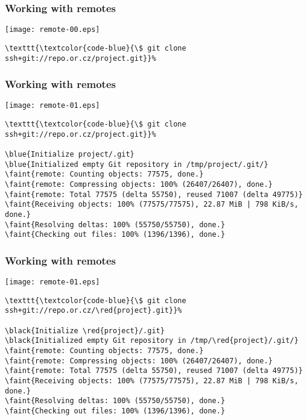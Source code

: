 \documentclass[english]{beamer}
\newcommand{\CMD}[1]{%
\texttt{\textcolor{code-blue}{#1}}%
}
\newcommand{\black}[1]{%
\textcolor{code-black}{#1}%
}
\newcommand{\faint}[1]{%
\textcolor{code-gray}{#1}%
}
\newcommand{\blue}[1]{%
\textcolor{code-blue}{#1}%
}
\newcommand{\red}[1]{%
\textcolor{code-red}{#1}%
}
\begin{document}
\begin{frame}[fragile]
\frametitle{Working with remotes}

\texttt{[image: remote-00.eps]}

\begin{Verbatim}[commandchars=\\\{\}]
\CMD{\$ git clone ssh+git://repo.or.cz/project.git}
\end{Verbatim}
\vspace{\textheight}
\end{frame}

\begin{frame}[fragile]
\frametitle{Working with remotes}

\texttt{[image: remote-01.eps]}

{\tiny
\begin{Verbatim}[commandchars=\\\{\}]
\CMD{\$ git clone ssh+git://repo.or.cz/project.git}
\blue{Initialize project/.git}
\blue{Initialized empty Git repository in /tmp/project/.git/}
\faint{remote: Counting objects: 77575, done.}
\faint{remote: Compressing objects: 100% (26407/26407), done.}
\faint{remote: Total 77575 (delta 55750), reused 71007 (delta 49775)}
\faint{Receiving objects: 100% (77575/77575), 22.87 MiB | 798 KiB/s, done.}
\faint{Resolving deltas: 100% (55750/55750), done.}
\faint{Checking out files: 100% (1396/1396), done.}
\end{Verbatim}
}
\vspace{\textheight}
\end{frame}

\begin{frame}[fragile]
\frametitle{Working with remotes}

\texttt{[image: remote-01.eps]}

{\tiny
\begin{Verbatim}[commandchars=\\\{\}]
\CMD{\$ git clone ssh+git://repo.or.cz/\red{project}.git}
\black{Initialize \red{project}/.git}
\black{Initialized empty Git repository in /tmp/\red{project}/.git/}
\faint{remote: Counting objects: 77575, done.}
\faint{remote: Compressing objects: 100% (26407/26407), done.}
\faint{remote: Total 77575 (delta 55750), reused 71007 (delta 49775)}
\faint{Receiving objects: 100% (77575/77575), 22.87 MiB | 798 KiB/s, done.}
\faint{Resolving deltas: 100% (55750/55750), done.}
\faint{Checking out files: 100% (1396/1396), done.}
\end{Verbatim}
}
\vspace{\textheight}
\end{frame}
\end{document}
